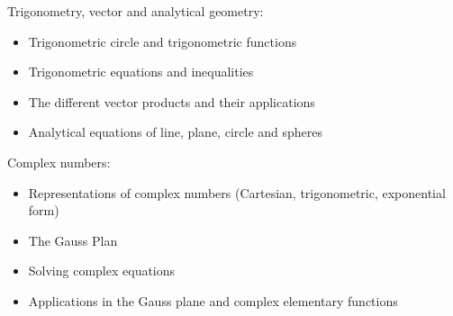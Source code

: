 Trigonometry, vector and analytical geometry:
\begin{itemize}
    \item Trigonometric circle and trigonometric functions
    \item Trigonometric equations and inequalities
    \item The different vector products and their applications
    \item Analytical equations of line, plane, circle and spheres
\end{itemize}
Complex numbers:
\begin{itemize}
    \item Representations of complex numbers (Cartesian, trigonometric, exponential form)
    \item The Gauss Plan
    \item Solving complex equations
    \item Applications in the Gauss plane and complex elementary functions
\end{itemize}